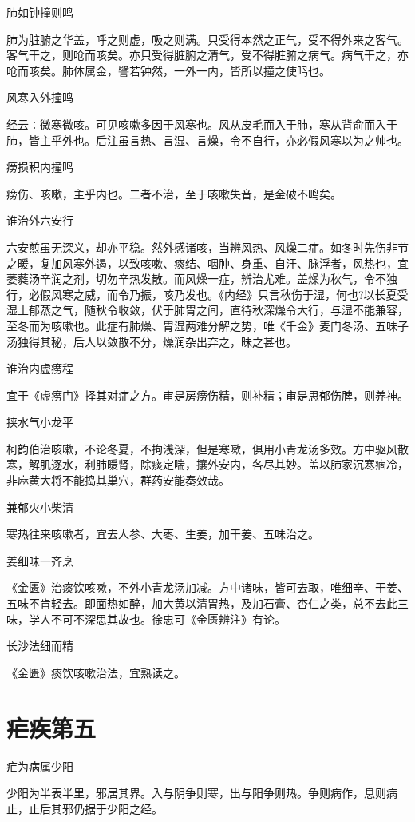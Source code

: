 \documentclass[a4paper,12pt,UTF8,twoside]{ctexbook}
\begin{document}
	肺如钟撞则鸣

	肺为脏腑之华盖，呼之则虚，吸之则满。只受得本然之正气，受不得外来之客气。客气干之，则呛而咳矣。亦只受得脏腑之清气，受不得脏腑之病气。病气干之，亦呛而咳矣。肺体属金，譬若钟然，一外一内，皆所以撞之使鸣也。
	
	风寒入外撞鸣

	经云∶微寒微咳。可见咳嗽多因于风寒也。风从皮毛而入于肺，寒从背俞而入于肺，皆主乎外也。后注虽言热、言湿、言燥，令不自行，亦必假风寒以为之帅也。
	
	痨损积内撞鸣

	痨伤、咳嗽，主乎内也。二者不治，至于咳嗽失音，是金破不鸣矣。
	
	谁治外六安行

	六安煎虽无深义，却亦平稳。然外感诸咳，当辨风热、风燥二症。如冬时先伤非节之暖，复加风寒外遏，以致咳嗽、痰结、咽肿、身重、自汗、脉浮者，风热也，宜萎蕤汤辛润之剂，切勿辛热发散。而风燥一症，辨治尤难。盖燥为秋气，令不独行，必假风寒之威，而令乃振，咳乃发也。《内经》只言秋伤于湿，何也?以长夏受湿土郁蒸之气，随秋令收敛，伏于肺胃之间，直待秋深燥令大行，与湿不能兼容，至冬而为咳嗽也。此症有肺燥、胃湿两难分解之势，唯《千金》麦门冬汤、五味子汤独得其秘，后人以敛散不分，燥润杂出弃之，昧之甚也。
	
	谁治内虚痨程

	宜于《虚痨门》择其对症之方。审是房痨伤精，则补精；审是思郁伤脾，则养神。
	
	挟水气小龙平

	柯韵伯治咳嗽，不论冬夏，不拘浅深，但是寒嗽，俱用小青龙汤多效。方中驱风散寒，解肌逐水，利肺暖肾，除痰定喘，攘外安内，各尽其妙。盖以肺家沉寒痼冷，非麻黄大将不能捣其巢穴，群药安能奏效哉。
	
	兼郁火小柴清
	
  寒热往来咳嗽者，宜去人参、大枣、生姜，加干姜、五味治之。
	
	姜细味一齐烹
	
  《金匮》治痰饮咳嗽，不外小青龙汤加减。方中诸味，皆可去取，唯细辛、干姜、五味不肯轻去。即面热如醉，加大黄以清胃热，及加石膏、杏仁之类，总不去此三味，学人不可不深思其故也。徐忠可《金匮辨注》有论。
	
	长沙法细而精
	
  《金匮》痰饮咳嗽治法，宜熟读之。
	
	\chapter{疟疾第五}
	疟为病属少阳
	
  少阳为半表半里，邪居其界。入与阴争则寒，出与阳争则热。争则病作，息则病止，止后其邪仍据于少阳之经。
	
\end{document}
